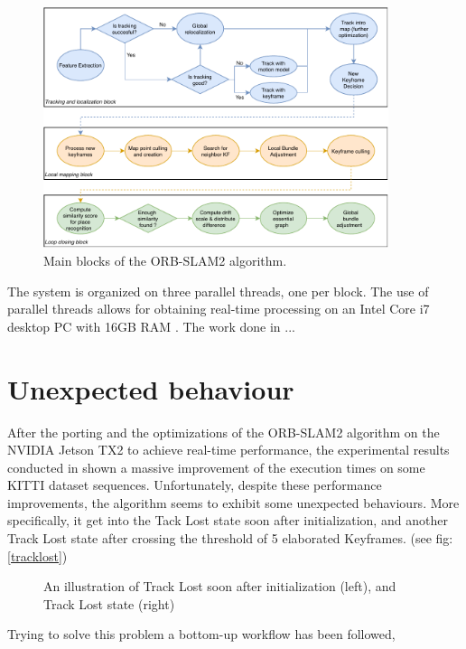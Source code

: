 \begin{figure}
	\centering
	\includegraphics[width=0.90\textwidth]{images/orb-slam-overview2.pdf}
	\caption{Main blocks of the ORB-SLAM2 algorithm.}
	\label{fig:orbslam}
\end{figure}


The system is organized on three parallel threads, one per block. The use of parallel threads allows for obtaining real-time processing on an Intel Core i7 desktop PC with 16GB RAM \cite{murORB2}.
The work done in \cite{iros2019} ...%


\section{Unexpected behaviour}
After the porting and the optimizations of the ORB-SLAM2 algorithm on the NVIDIA Jetson TX2 to achieve real-time performance, the experimental results conducted in \cite{iros2019} shown a massive improvement of the execution times on some KITTI dataset sequences.
Unfortunately, despite these performance improvements, the algorithm seems to exhibit some unexpected behaviours.
More specifically, it get into the Tack Lost state soon after initialization, and another Track Lost state after crossing the threshold of 5 elaborated Keyframes. (see fig: \ref{tracklost})


\begin{figure}
	\centering
	\caption{An illustration of Track Lost soon after initialization (left), and Track Lost state (right)}
	\label{fig:tracklost}
\end{figure}


Trying to solve this problem a bottom-up workflow has been followed, %

